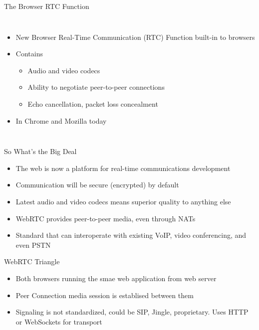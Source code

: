 \begin{frame}{The Browser RTC Function}

\begin{columns}
\begin{itemize}
\item New Browser Real-Time Communication (RTC) Function built-in to browsers
\item Contains
\begin{itemize}
\item Audio and video codecs
\item Ability to negotiate peer-to-peer connections
\item Echo cancellation, packet loss concealment
\end{itemize}
\item In Chrome and Mozilla today
\end{itemize}

\end{columns}

\end{frame}

\begin{frame}{So What's the Big Deal}
\begin{itemize}
\item The web is now a platform for real-time communications development
\item Communication will be secure (encrypted) by default
\item Latest audio and video codecs means superior quality to anything else
\item WebRTC provides peer-to-peer media, even through NATs
\item Standard that can interoperate with existing VoIP, video conferencing, and even PSTN
\end{itemize}
\end{frame}

\begin{frame}{WebRTC Triangle}

\begin{itemize}
\item Both browsers running the smae web application from web server
\item Peer Connection media session is establised between them
\item Signaling is not standardized, could be SIP, Jingle, proprietary. Uses HTTP or WebSockets for transport
\end{itemize}
\end{frame}

